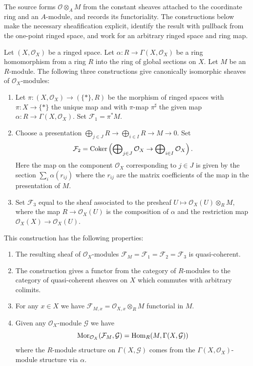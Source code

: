 \begin{lemma}
\label{lemma-construct-quasi-coherent-sheaves}
\begin{reference}
\cite[Chapter II, \S 4, no. 48, associated-sheaf construction,
p. 240]{FAC}
\end{reference}
\begin{history}
The source forms $\mathcal{O} \otimes_A M$ from the constant sheaves
attached to the coordinate ring and an $A$-module, and records its
functoriality. The constructions below make the necessary sheafification
explicit, identify the result with pullback from the one-point ringed space,
and work for an arbitrary ringed space and ring map.
\end{history}
Let $(X, \mathcal{O}_X)$ be a ringed space.
Let $\alpha : R \to \Gamma(X, \mathcal{O}_X)$ be a ring homomorphism from
a ring $R$ into the ring of global sections on $X$.
Let $M$ be an $R$-module.
The following three constructions give canonically isomorphic
sheaves of $\mathcal{O}_X$-modules:
\begin{enumerate}
\item Let $\pi : (X, \mathcal{O}_X) \longrightarrow (\{*\}, R)$
be the morphism of ringed spaces with $\pi : X \to \{*\}$
the unique map and with $\pi$-map $\pi^\sharp$ the given map
$\alpha : R \to \Gamma(X, \mathcal{O}_X)$. Set $\mathcal{F}_1 = \pi^*M$.
\item Choose a presentation
$\bigoplus_{j \in J} R \to \bigoplus_{i \in I} R \to M \to 0$.
Set
$$
\mathcal{F}_2 = \mathop{\mathrm{Coker}}\left(
\bigoplus\nolimits_{j \in J} \mathcal{O}_X
\to
\bigoplus\nolimits_{i \in I} \mathcal{O}_X
\right).
$$
Here the map on the component $\mathcal{O}_X$ corresponding to $j \in J$
is given by the section $\sum_i \alpha(r_{ij})$ where the $r_{ij}$
are the matrix coefficients of the map in the presentation of $M$.
\item Set $\mathcal{F}_3$ equal to the sheaf associated to the presheaf
$U \mapsto \mathcal{O}_X(U) \otimes_R M$, where the map
$R \to \mathcal{O}_X(U)$ is the composition of $\alpha$ and
the restriction map $\mathcal{O}_X(X) \to \mathcal{O}_X(U)$.
\end{enumerate}
This construction has the following properties:
\begin{enumerate}
\item The resulting sheaf of $\mathcal{O}_X$-modules
$\mathcal{F}_M = \mathcal{F}_1 = \mathcal{F}_2 = \mathcal{F}_3$
is quasi-coherent.
\item The construction gives a functor from
the category of $R$-modules to the category of quasi-coherent
sheaves on $X$ which commutes with arbitrary colimits.
\item For any $x \in X$ we have
$\mathcal{F}_{M, x} = \mathcal{O}_{X, x} \otimes_R M$
functorial in $M$.
\item Given any $\mathcal{O}_X$-module
$\mathcal{G}$ we have
$$
\mathop{\mathrm{Mor}}\nolimits_{\mathcal{O}_X}(\mathcal{F}_M, \mathcal{G})
=
\mathop{\mathrm{Hom}}\nolimits_R(M, \Gamma(X, \mathcal{G}))
$$
where the $R$-module structure on $\Gamma(X, \mathcal{G})$
comes from the $\Gamma(X, \mathcal{O}_X)$-module structure via
$\alpha$.
\end{enumerate}
\end{lemma}

